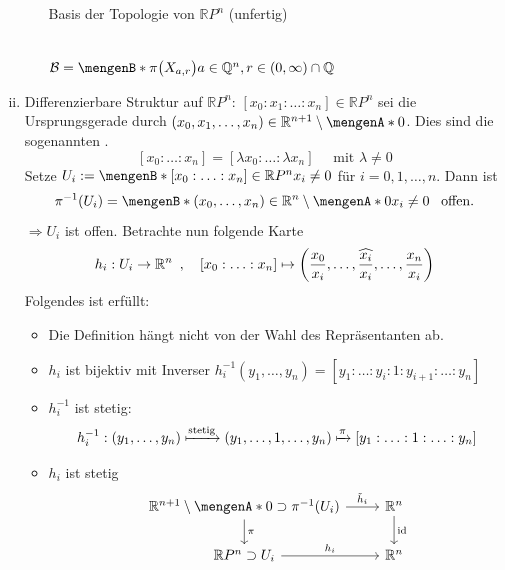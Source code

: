 \begin{enumerate}[(i)]
\begin{itemize}
\begin{minipage}{\textwidth}
{
			\caption{Basis der Topologie von $\mathds{R}P^n$ (unfertig)}
			}
		\end{minipage} \smallskip \\
		$\mathcal{B} = \set[\pi \protect{\enbrace[\big]{X_{a,r}}}]{a \in \mathds{Q}^n, r \in (0,\infty)\cap \mathds{Q}}$
	\end{itemize}
	\item Differenzierbare Struktur auf $\mathds{R}P^n$: $[x_0 : x_1 : \ldots : x_n] \in \mathds{R}P^n$ sei die Ursprungsgerade durch $(x_0, x_1, \ldots , x_n) \in
	\mathds{R}^{n+1} \setminus \set{0}$. Dies sind die sogenannten .
	\[
		[x_0 : \ldots : x_n] = [\lambda x_0 : \ldots : \lambda x_n] \quad \text{ mit } \lambda \not= 0
	\]
	Setze $U_i := \set[{[x_0 : \ldots : x_n] \in \mathds{R}P^n}]{x_i \not= 0} $ für $i=0,1,\ldots ,n$. Dann ist
	\[
		\pi  ^{-1} (U_i) = \set[(x_0, \ldots , x_n) \in \mathds{R}^n \setminus \set{0} ]{x_i \not= 0}  \enspace\text{ offen.}
	\]
	$\Rightarrow U_i$ ist offen. Betrachte nun folgende Karte
	\[
		h_i : U_i \to \mathds{R}^n \enspace, \quad [x_0 : \ldots : x_n] \mapsto \enbrace*{ \frac{x_0}{x_i}, \ldots , \widehat{\frac{x_i}{x_i}}, \ldots , \frac{x_n}{x_i}   } 
	\]
	Folgendes ist erfüllt:
	\begin{itemize}
		\item Die Definition hängt nicht von der Wahl des Repräsentanten ab.
		\item $h_i$ ist bijektiv mit Inverser $h_i ^{-1} (y_1, \ldots , y_n) = [y_1 : \ldots  : y_i : 1 : y_{i+1} : \ldots : y_n]$
		\item $h_i ^{-1}$ ist stetig: 
		\[
			h_i ^{-1} : (y_1, \ldots , y_n) \xmapsto{\text{stetig}} (y_1, \ldots ,1, \ldots , y_n) \xmapsto{\pi } [y_1 : \ldots : 1 : \ldots : y_n]
		\]
		\item $h_i$ ist stetig
		\[
			\begin{tikzcd}
				\mathds{R}^{n+1} \setminus \set{0} \supset \pi  ^{-1} (U_i) \rar{\tilde h_i} \dar{\pi } & \mathds{R}^n \dar{\id} \\ 
				\mathds{R}P^n \supset U_i \rar{h_i} & \mathds{R}^n 

\end{tikzcd}\]
\end{itemize}
\end{enumerate}
